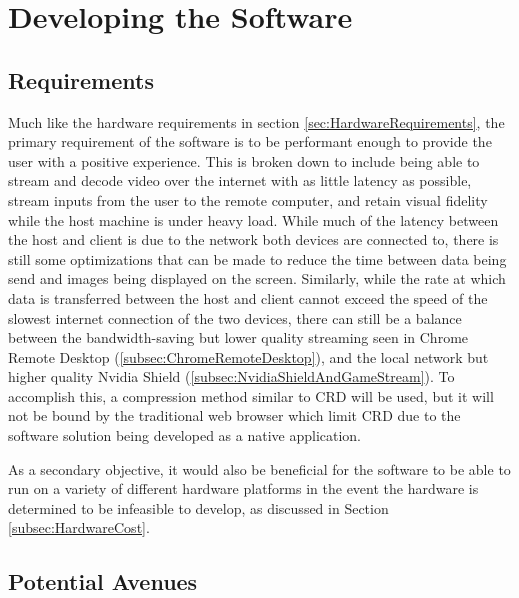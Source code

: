 \chapter{Developing the Software} %

\label{Chapter5} %

\todosection


\section{Requirements}\label{sec:SoftwareRequirements}

Much like the hardware requirements in section \ref{sec:HardwareRequirements}, the primary requirement of the software is to be performant enough to provide the user with a positive experience.
This is broken down to include being able to stream and decode video over the internet with as little latency as possible, stream inputs from the user to the remote computer, and retain visual fidelity while the host machine is under heavy load.
While much of the latency between the host and client is due to the network both devices are connected to, there is still some optimizations that can be made to reduce the time between data being send and images being displayed on the screen.
Similarly, while the rate at which data is transferred between the host and client cannot exceed the speed of the slowest internet connection of the two devices, there can still be a balance between the bandwidth-saving but lower quality streaming seen in Chrome Remote Desktop (\ref{subsec:ChromeRemoteDesktop}), and the local network but higher quality Nvidia Shield (\ref{subsec:NvidiaShieldAndGameStream}).
To accomplish this, a compression method similar to CRD will be used, but it will not be bound by the traditional web browser which limit CRD due to the software solution being developed as a native application.

As a secondary objective, it would also be beneficial for the software to be able to run on a variety of different hardware platforms in the event the hardware is determined to be infeasible to develop, as discussed in Section \ref{subsec:HardwareCost}.


\section{Potential Avenues}\label{sec:PotentialAvenues}

